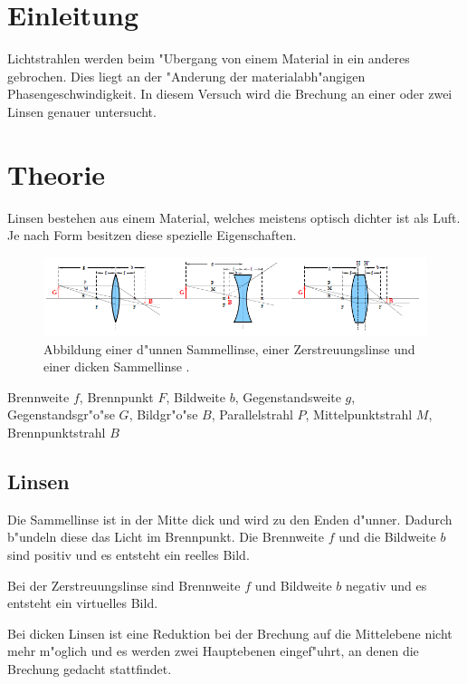 \section{Einleitung}
	\label{sec:einleitung}
	
	Lichtstrahlen werden beim "Ubergang von einem Material in ein anderes gebrochen.
	Dies liegt an der "Anderung der materialabh"angigen Phasengeschwindigkeit.
	In diesem Versuch wird die Brechung an einer oder zwei Linsen genauer untersucht.

\section{Theorie}
	\label{sec:theorie}

	Linsen bestehen aus einem Material, welches meistens optisch dichter ist als Luft.
	Je nach Form besitzen diese spezielle Eigenschaften.
	
	\begin{figure}[htbp]
		\centering
		\includegraphics[width = 12cm]{img/linsen.PNG}
		\caption{Abbildung einer d"unnen Sammellinse, einer Zerstreuungslinse und einer dicken Sammellinse \cite{anleitung}.}
		\label{sammellinse}
	\end{figure}

	\begin{center}
			\tiny{Brennweite $f$, Brennpunkt $F$, Bildweite $b$, Gegenstandsweite $g$, Gegenstandsgr"o"se $G$, Bildgr"o"se $B$, Parallelstrahl $P$, Mittelpunktstrahl $M$, Brennpunktstrahl $B$}
	\end{center}

	\subsection{Linsen} %
	\label{sub:sammellinse}
	
	Die Sammellinse ist in der Mitte dick und wird zu den Enden d"unner. Dadurch b"undeln diese das Licht im Brennpunkt.
	Die Brennweite $f$ und die Bildweite $b$ sind positiv und es entsteht ein reelles Bild.

	Bei der Zerstreuungslinse sind Brennweite $f$ und Bildweite $b$ negativ und es entsteht ein virtuelles Bild.

	Bei dicken Linsen ist eine Reduktion bei der Brechung auf die Mittelebene nicht mehr m"oglich und es werden zwei Hauptebenen eingef"uhrt, an denen die Brechung gedacht stattfindet.

